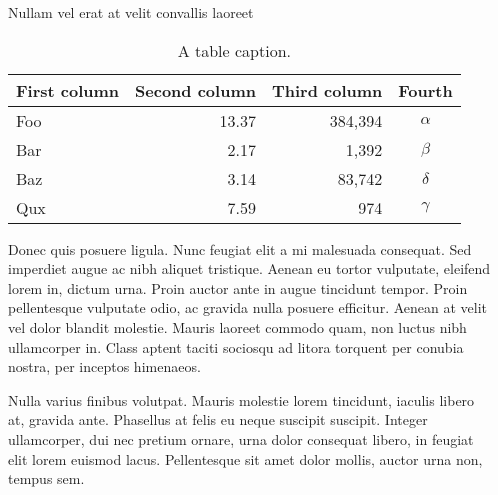 \documentclass[final]{beamer}
\newlength{\sepwidth}
\newlength{\colwidth}
\newcommand{\separatorcolumn}{\begin{column}{\sepwidth}\end{column}}
\begin{document}
\begin{frame}[t]
\begin{columns}[t]
\begin{column}{\colwidth}
\begin{block}{Nullam vel erat at velit convallis laoreet}
        \begin{table}
          \centering
          \begin{tabular}{l r r c}
            \toprule
            \textbf{First column} & \textbf{Second column} & \textbf{Third column} & \textbf{Fourth} \\
            \midrule
            Foo                   & 13.37                  & 384,394               & $\alpha$        \\
            Bar                   & 2.17                   & 1,392                 & $\beta$         \\
            Baz                   & 3.14                   & 83,742                & $\delta$        \\
            Qux                   & 7.59                   & 974                   & $\gamma$        \\
            \bottomrule
          \end{tabular}
          \caption{A table caption.}
        \end{table}

        Donec quis posuere ligula. Nunc feugiat elit a mi malesuada consequat. Sed
        imperdiet augue ac nibh aliquet tristique. Aenean eu tortor vulputate,
        eleifend lorem in, dictum urna. Proin auctor ante in augue tincidunt
        tempor. Proin pellentesque vulputate odio, ac gravida nulla posuere
        efficitur. Aenean at velit vel dolor blandit molestie. Mauris laoreet
        commodo quam, non luctus nibh ullamcorper in. Class aptent taciti sociosqu
        ad litora torquent per conubia nostra, per inceptos himenaeos.

        Nulla varius finibus volutpat. Mauris molestie lorem tincidunt, iaculis
        libero at, gravida ante. Phasellus at felis eu neque suscipit suscipit.
        Integer ullamcorper, dui nec pretium ornare, urna dolor consequat libero,
        in feugiat elit lorem euismod lacus. Pellentesque sit amet dolor mollis,
        auctor urna non, tempus sem.

      \end{block}
    \end{column}


    \separatorcolumn
  \end{columns}
\end{frame}
\end{document}
